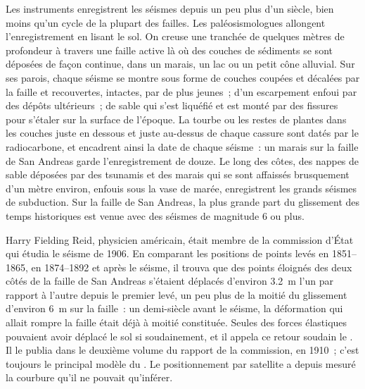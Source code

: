 \begin{inthefield}
Les instruments enregistrent les séismes depuis un peu plus d'un siècle, bien
moins qu'un cycle de la plupart des failles. Les paléosismologues allongent l'enregistrement en
lisant le sol. On creuse une tranchée de quelques mètres de profondeur à travers une faille active
là où des couches de sédiments se sont déposées de façon continue, dans un marais, un lac
ou un petit cône alluvial. Sur ses parois, chaque séisme se montre sous forme de couches coupées et
décalées par la faille et recouvertes, intactes, par de plus jeunes~; d'un escarpement enfoui
par des dépôts ultérieurs~; de sable qui s'est liquéfié et est monté par des fissures pour s'étaler
sur la surface de l'époque. La tourbe ou les restes de plantes dans les couches juste en dessous
et juste au-dessus de chaque cassure sont datés par le radiocarbone, et encadrent ainsi la date de
chaque séisme~: un marais sur la faille de San Andreas garde l'enregistrement de douze.
Le long des côtes, des nappes de sable déposées par des tsunamis et des marais qui se sont affaissés
brusquement d'un mètre environ, enfouis sous la vase de marée, enregistrent les grands
séismes de subduction. Sur la faille de San Andreas, la plus grande part du glissement des temps historiques
est venue avec des séismes de magnitude 6 ou plus.
\end{inthefield}

\begin{history}
Harry Fielding Reid, physicien américain, était membre de la commission d'État
qui étudia le séisme de 1906. En comparant les positions de
points levés en 1851--1865, en 1874--1892 et après le séisme, il
trouva que des points éloignés des deux côtés de la faille de San Andreas s'étaient déplacés
d'environ \qty{3.2}{m} l'un par rapport à l'autre depuis le premier levé, un peu
plus de la moitié du glissement d'environ \qty{6}{m} sur la faille~: un demi-siècle avant
le séisme, la déformation qui allait rompre la faille était déjà à moitié constituée. Seules
des forces élastiques pouvaient avoir déplacé le sol si soudainement, et il appela ce
retour soudain le . Il le publia dans le deuxième volume du rapport
de la commission, en 1910~; c'est toujours le principal modèle du
. Le positionnement par satellite a depuis mesuré la courbure qu'il ne pouvait
qu'inférer.
\end{history}

